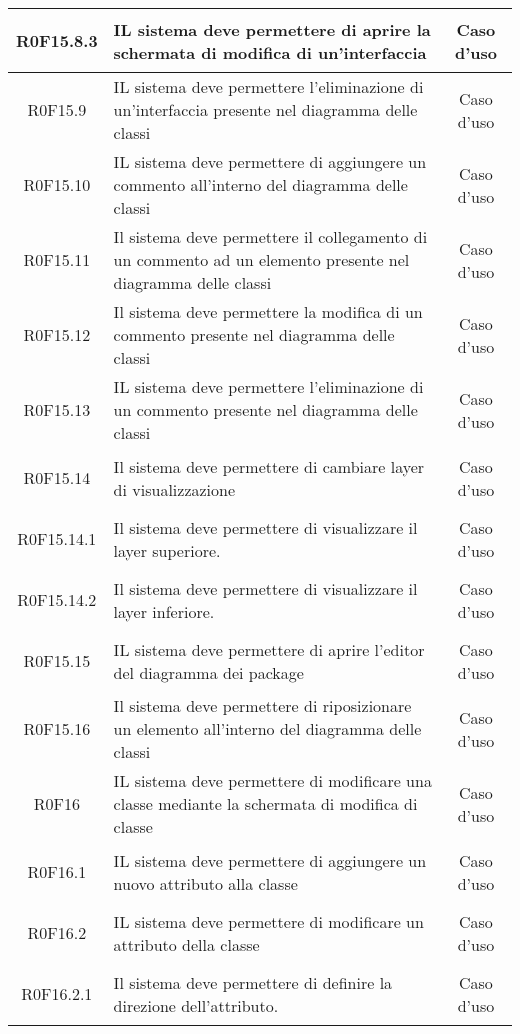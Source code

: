 \documentclass[../AnalisiDeiRequisiti.tex]{subfiles}
\begin{document}
\begin{longtable}{|c|>{\centering}p{7cm}|c|}
	\hypertarget{R0F15.8.3}{R0F15.8.3} & IL sistema deve permettere di aprire la schermata di modifica di un'interfaccia & Caso d'uso \\ \hline
	\hypertarget{R0F15.9}{R0F15.9} & IL sistema deve permettere l'eliminazione di un'interfaccia presente nel diagramma delle classi & Caso d'uso \\ \hline
	\hypertarget{R0F15.10}{R0F15.10} & IL sistema deve permettere di aggiungere un commento all'interno del diagramma delle classi & Caso d'uso \\ \hline
	\hypertarget{R0F15.11}{R0F15.11} & Il sistema deve permettere il collegamento di un commento ad un elemento presente nel diagramma delle classi & Caso d'uso \\ \hline
	\hypertarget{R0F15.12}{R0F15.12} & Il sistema deve permettere la modifica di un commento presente nel diagramma delle classi & Caso d'uso \\ \hline
	\hypertarget{R0F15.13}{R0F15.13} & IL sistema deve permettere l'eliminazione di un commento presente nel diagramma delle classi & Caso d'uso \\ \hline
	\hypertarget{R0F15.14}{R0F15.14} & Il sistema deve permettere di cambiare layer di visualizzazione & Caso d'uso \\ \hline
	\hypertarget{R0F15.14.1}{R0F15.14.1} & Il sistema deve permettere di visualizzare il layer superiore. & Caso d'uso \\ \hline
	\hypertarget{R0F15.14.2}{R0F15.14.2} & Il sistema deve permettere di visualizzare il layer inferiore. & Caso d'uso \\ \hline
	\hypertarget{R0F15.15}{R0F15.15} & IL sistema deve permettere di aprire l'editor del diagramma dei package & Caso d'uso \\ \hline
	\hypertarget{R0F15.16}{R0F15.16} & Il sistema deve permettere di riposizionare un elemento all'interno del diagramma delle classi & Caso d'uso \\ \hline
	\hypertarget{R0F16}{R0F16} & IL sistema deve permettere di modificare una classe mediante la schermata di modifica di classe & Caso d'uso \\ \hline
	\hypertarget{R0F16.1}{R0F16.1} & IL sistema deve permettere di aggiungere un nuovo attributo alla classe & Caso d'uso \\ \hline
	\hypertarget{R0F16.2}{R0F16.2} & IL sistema deve permettere di modificare un attributo della classe & Caso d'uso \\ \hline
	\hypertarget{R0F16.2.1}{R0F16.2.1} & Il sistema deve permettere di definire la direzione dell'attributo. & Caso d'uso \\ \hline

\end{longtable}
\end{document}
